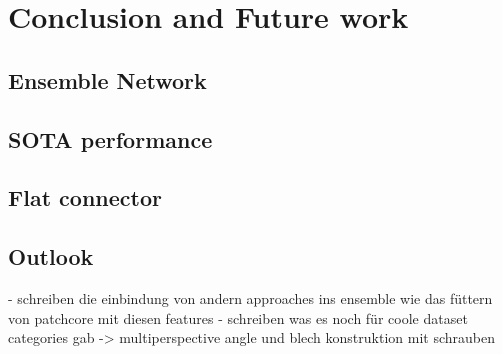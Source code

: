 \chapter{Conclusion and Future work}
\label{chap:conclusion}

\section{Ensemble Network}
\label{sec:ensembleconclusion}

\section{SOTA performance}
\label{sec:sotaperformance}

\section{Flat connector}
\label{sec:flatconnector}

\section{Outlook}
\label{sec:outlook}

- schreiben die einbindung von andern approaches ins ensemble wie das füttern von patchcore mit diesen features
- schreiben was es noch für coole dataset categories gab -> multiperspective angle und blech konstruktion mit schrauben